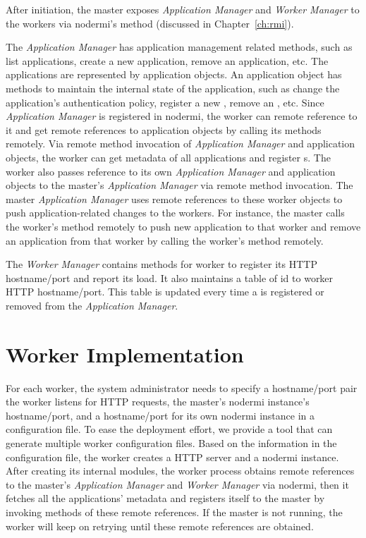 After initiation, the master exposes \emph{Application Manager} and
\emph{Worker Manager} to the workers via nodermi's   method
(discussed in Chapter~\ref{ch:rmi}).

The \emph{Application Manager} has application management related  methods,
such as list applications, create a new application, remove an application,
etc.  The applications are represented by application objects. An application
object has methods to maintain the internal state of the application, such as
change the application's authentication policy, register a new \appins, remove
an \appins, etc.  Since \emph{Application Manager} is registered in nodermi,
the worker can remote reference to it and get remote references to application
objects by calling its methods remotely. Via remote method invocation of
\emph{Application Manager} and application objects, the worker can get
metadata of all applications and register \appins{}s.  The worker also passes
reference to its own \emph{Application Manager}  and application objects to
the master's \emph{Application Manager} via remote method invocation.  The
master \emph{Application Manager}  uses remote references to these worker
objects to push application-related changes to the  workers.  For instance,
the master calls  the worker's   method remotely   to
push new application to that worker and remove an application from that worker
by calling the worker's  method remotely.

The \emph{Worker Manager} contains methods for worker to register its HTTP
hostname/port and report its load. It also maintains a table of \appins{} id
to worker HTTP hostname/port. This table is updated every time a \appins{}
is registered or removed from the \emph{Application Manager}.




\section{Worker Implementation}
\label{sec:worker}

For each worker, the system administrator needs to specify a hostname/port
pair the worker listens for HTTP requests,  the master's nodermi instance's
hostname/port, and a hostname/port for its own nodermi instance in a
configuration file. To ease the deployment effort, we provide a tool that can
generate multiple worker configuration files. Based on the information in the
configuration file, the worker creates a HTTP server and a nodermi instance.
After creating its internal modules, the worker process obtains remote
references to the master's \emph{Application Manager} and \emph{Worker
Manager} via nodermi, then  it fetches all the applications' metadata and
registers itself to the master by invoking methods of these remote references.
If the master is not running, the worker will keep on retrying until these
remote references are obtained.


